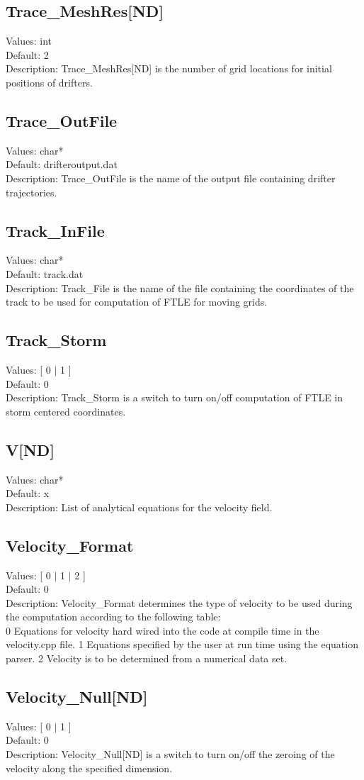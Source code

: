 \documentclass[11pt]{article}
\begin{document}
\subsection{Trace\_MeshRes[ND]}
Values:   int \\
Default:  2\\
Description: Trace\_MeshRes[ND] is the number of grid locations for initial positions of drifters.

\subsection{Trace\_OutFile}
Values:   char* \\
Default:  drifteroutput.dat\\
Description:  Trace\_OutFile is the name of the output file containing drifter trajectories.

\subsection{Track\_InFile}
Values:   char* \\
Default:  track.dat\\
Description:  Track\_File is the name of the file containing the coordinates of the track to be used for computation of FTLE for moving grids.

\subsection{Track\_Storm}
Values:   [ 0 $|$ 1 ]  \\
Default:  0\\
Description:  Track\_Storm is a switch to turn on/off computation of FTLE in storm centered coordinates.

\subsection{V[ND]}
Values:   char*\\
Default:  x\\
Description:  List of analytical equations for the velocity field.

\subsection{Velocity\_Format}
Values:   [ 0 $|$ 1 $|$ 2 ]  \\
Default:  0\\
Description:  Velocity\_Format determines the type of velocity to be used during the computation according to the following table:\\
0	Equations for velocity hard wired into the code at compile time in the velocity.cpp file.
1	Equations specified by the user at run time using the equation parser.
2	Velocity is to be determined from a numerical data set.

\subsection{Velocity\_Null[ND]}
Values:   [ 0 $|$ 1 ]\\
Default:  0\\
Description:  Velocity\_Null[ND] is a switch to turn on/off the zeroing of the velocity along the specified dimension.
\end{document}
